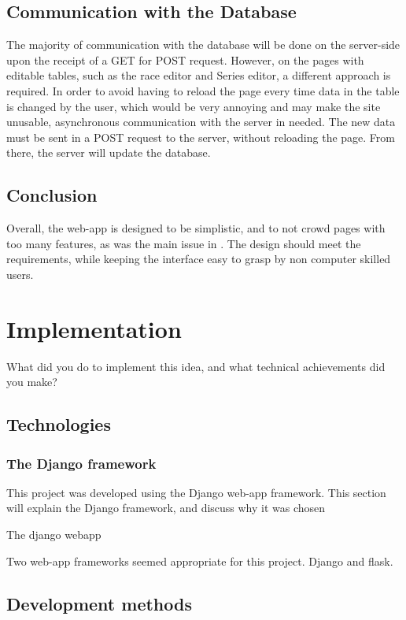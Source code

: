 \documentclass{l4proj}
\begin{document}
\section{Communication with the Database}

The majority of communication with the database will be done on the server-side upon the receipt of a GET for POST request. However, on the pages with editable tables, such as the race editor and Series editor, a different approach is required. In order to avoid having to reload the page every time data in the table is changed by the user, which would be very annoying and may make the site unusable, asynchronous communication with the server in needed. The new data must be sent in a POST request to the server, without reloading the page. From there, the server will update the database.

\section{Conclusion}

Overall, the web-app is designed to be simplistic, and to not crowd pages with too many features, as was the main issue in \citet{sailwave}. The design should meet the requirements, while keeping the interface easy to grasp by non computer skilled users.


\chapter{Implementation}
What did you do to implement this idea, and what technical achievements did you make?
\section{Technologies}

\subsection{The Django framework}
This project was developed using the Django web-app framework. This section will explain the Django framework, and discuss why it was chosen

The django webapp

Two web-app frameworks seemed appropriate for this project. Django and flask.

\section{Development methods}
\end{document}
